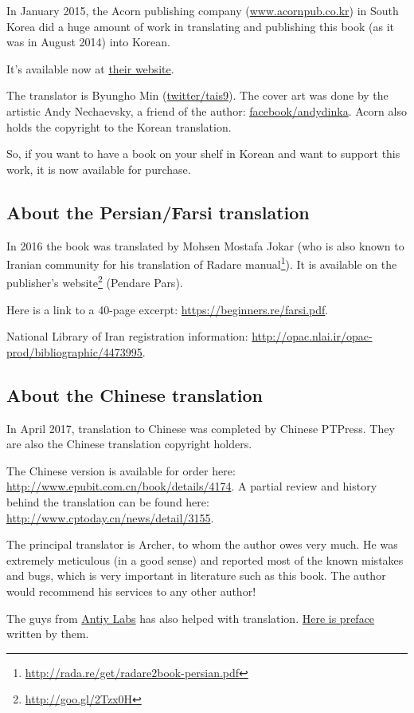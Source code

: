 In January 2015, the Acorn publishing company (\href{http://www.acornpub.co.kr}{www.acornpub.co.kr}) in South Korea did a huge amount of work in translating and publishing
this book (as it was in August 2014) into Korean.

It's available now at \href{http://go.yurichev.com/17343}{their website}.

The translator is Byungho Min (\href{http://go.yurichev.com/17344}{twitter/tais9}).
The cover art was done by the artistic Andy Nechaevsky, a friend of the author:
\href{http://go.yurichev.com/17023}{facebook/andydinka}.
Acorn also holds the copyright to the Korean translation.

So, if you want to have a  book on your shelf in Korean and
want to support this work, it is now available for purchase.

\subsection*{About the Persian/Farsi translation}

In 2016 the book was translated by Mohsen Mostafa Jokar (who is also known to Iranian community for his translation of Radare manual\footnote{\url{http://rada.re/get/radare2book-persian.pdf}}).
It is available on the publisher’s website\footnote{\url{http://goo.gl/2Tzx0H}} (Pendare Pars).

Here is a link to a 40-page excerpt: \url{https://beginners.re/farsi.pdf}.

National Library of Iran registration information: \url{http://opac.nlai.ir/opac-prod/bibliographic/4473995}.

\subsection*{About the Chinese translation}

In April 2017, translation to Chinese was completed by Chinese PTPress. They are also the Chinese translation copyright holders.

 The Chinese version is available for order here: \url{http://www.epubit.com.cn/book/details/4174}. A partial review and history behind the translation can be found here: \url{http://www.cptoday.cn/news/detail/3155}.

The principal translator is Archer, to whom the author owes very much. He was extremely meticulous (in a good sense) and reported most of the known mistakes and bugs, which is very important in literature such as this book.
The author would recommend his services to any other author!

The guys from \href{http://www.antiy.net/}{Antiy Labs} has also helped with translation. \href{http://www.epubit.com.cn/book/onlinechapter/51413}{Here is preface} written by them.

